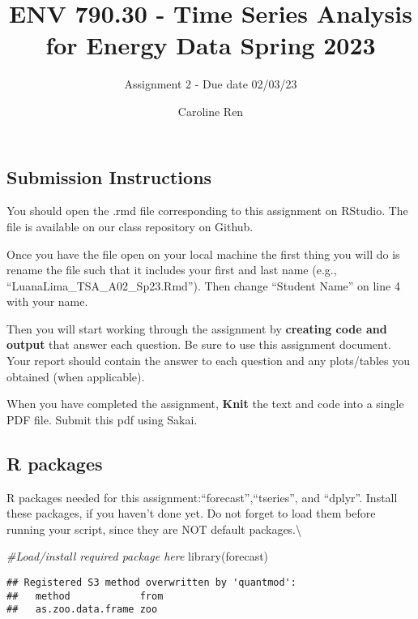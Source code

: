 \documentclass[
]{article}
\title{ENV 790.30 - Time Series Analysis for Energy Data \textbar{}
Spring 2023}
\subtitle{Assignment 2 - Due date 02/03/23}
\author{Caroline Ren}
\date{}
\newenvironment{Shaded}{\begin{snugshade}}{\end{snugshade}}
\newcommand{\CommentTok}[1]{\textcolor[rgb]{0.56,0.35,0.01}{\textit{#1}}}
\newcommand{\FunctionTok}[1]{\textcolor[rgb]{0.00,0.00,0.00}{#1}}
\newcommand{\NormalTok}[1]{#1}
\begin{document}
\maketitle

\hypertarget{submission-instructions}{%
\subsection{Submission Instructions}\label{submission-instructions}}

You should open the .rmd file corresponding to this assignment on
RStudio. The file is available on our class repository on Github.

Once you have the file open on your local machine the first thing you
will do is rename the file such that it includes your first and last
name (e.g., ``LuanaLima\_TSA\_A02\_Sp23.Rmd''). Then change ``Student
Name'' on line 4 with your name.

Then you will start working through the assignment by \textbf{creating
code and output} that answer each question. Be sure to use this
assignment document. Your report should contain the answer to each
question and any plots/tables you obtained (when applicable).

When you have completed the assignment, \textbf{Knit} the text and code
into a single PDF file. Submit this pdf using Sakai.

\hypertarget{r-packages}{%
\subsection{R packages}\label{r-packages}}

R packages needed for this assignment:``forecast'',``tseries'', and
``dplyr''. Install these packages, if you haven't done yet. Do not
forget to load them before running your script, since they are NOT
default packages.\textbackslash{}

\begin{Shaded}
\begin{Highlighting}[]
\CommentTok{\#Load/install required package here}
\FunctionTok{library}\NormalTok{(forecast)}
\end{Highlighting}
\end{Shaded}

\begin{verbatim}
## Registered S3 method overwritten by 'quantmod':
##   method            from
##   as.zoo.data.frame zoo
\end{verbatim}
\end{document}
